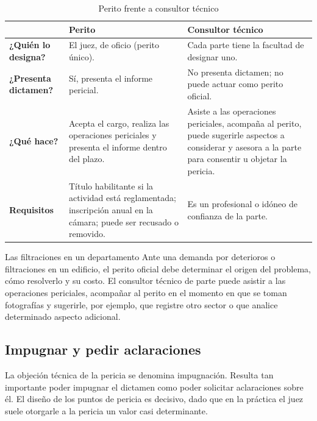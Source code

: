 \documentclass[12pt,oneside]{book}
\begin{document}
\begin{table}[H]
\centering
\caption{Perito frente a consultor técnico}
\begin{tabularx}{\textwidth}{>{\raggedright\arraybackslash}p{} X X}
\toprule
 & \textbf{Perito} & \textbf{Consultor técnico} \\
\midrule
\textbf{¿Quién lo designa?} & El juez, de oficio (perito único). & Cada parte tiene la facultad de designar uno. \\
\textbf{¿Presenta dictamen?} & Sí, presenta el informe pericial. & No presenta dictamen; no puede actuar como perito oficial. \\
\textbf{¿Qué hace?} & Acepta el cargo, realiza las operaciones periciales y presenta el informe dentro del plazo. & Asiste a las operaciones periciales, acompaña al perito, puede sugerirle aspectos a considerar y asesora a la parte para consentir u objetar la pericia. \\
\textbf{Requisitos} & Título habilitante si la actividad está reglamentada; inscripción anual en la cámara; puede ser recusado o removido. & Es un profesional o idóneo de confianza de la parte. \\
\bottomrule
\end{tabularx}
\end{table}

\begin{example}{Las filtraciones en un departamento}
Ante una demanda por deterioros o filtraciones en un edificio, el perito oficial debe determinar el origen del problema, cómo resolverlo y su costo. El consultor técnico de parte puede asistir a las operaciones periciales, acompañar al perito en el momento en que se toman fotografías y sugerirle, por ejemplo, que registre otro sector o que analice determinado aspecto adicional.
\end{example}

\subsection{Impugnar y pedir aclaraciones}

\begin{important}
La objeción técnica de la pericia se denomina impugnación. Resulta tan importante poder impugnar el dictamen como poder solicitar aclaraciones sobre él. El diseño de los puntos de pericia es decisivo, dado que en la práctica el juez suele otorgarle a la pericia un valor casi determinante.
\end{important}
\end{document}
